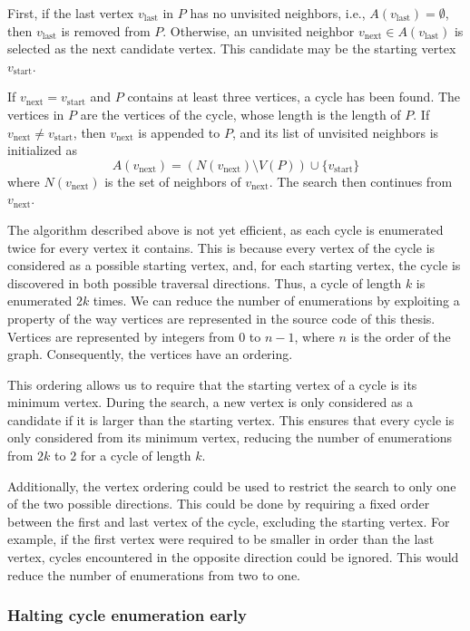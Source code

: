 First, if the last vertex $v_{\text{last}}$ in $P$ has no unvisited neighbors, i.e., $A(v_{\text{last}})=\emptyset$, then $v_{\text{last}}$ is removed from $P$. Otherwise, an unvisited neighbor $v_{\text{next}} \in A(v_{\text{last}})$ is selected as the next candidate vertex. This candidate may be the starting vertex $v_{\text{start}}$.

If $v_{\text{next}}=v_{\text{start}}$ and $P$ contains at least three vertices, a cycle has been found. The vertices in $P$ are the vertices of the cycle, whose length is the length of $P$. If $v_{\text{next}} \neq v_{\text{start}}$, then $v_{\text{next}}$ is appended to $P$, and its list of unvisited neighbors is initialized as
\[
A(v_{\text{next}}) =
(N(v_{\text{next}}) \setminus V(P)) \cup \{v_{\text{start}}\}
\]
where $N(v_{\text{next}})$ is the set of neighbors of $v_{\text{next}}$. The search then continues from $v_{\text{next}}$.

The algorithm described above is not yet efficient, as each cycle is enumerated twice for every vertex it contains. This is because every vertex of the cycle is considered as a possible starting vertex, and, for each starting vertex, the cycle is discovered in both possible traversal directions. Thus, a cycle of length $k$ is enumerated $2k$ times. We can reduce the number of enumerations by exploiting a property of the way vertices are represented in the source code of this thesis. Vertices are represented by integers from $0$ to $n-1$, where $n$ is the order of the graph. Consequently, the vertices have an ordering.

This ordering allows us to require that the starting vertex of a cycle is its minimum vertex. During the search, a new vertex is only considered as a candidate if it is larger than the starting vertex. This ensures that every cycle is only considered from its minimum vertex, reducing the number of enumerations from $2k$ to $2$ for a cycle of length $k$.

Additionally, the vertex ordering could be used to restrict the search to only one of the two possible directions. This could be done by requiring a fixed order between the first and last vertex of the cycle, excluding the starting vertex. For example, if the first vertex were required to be smaller in order than the last vertex, cycles encountered in the opposite direction could be ignored. This would reduce the number of enumerations from two to one.

\subsubsection{Halting cycle enumeration early}

